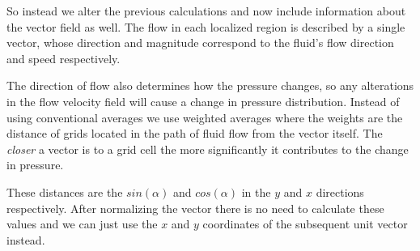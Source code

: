 \documentclass[12pt, titlepage]{article}
\begin{document}
\begin{center}
\end{center}

So instead we alter the previous calculations and now include information about the vector field as well. The flow in each localized region is described by a single vector, whose direction and magnitude correspond to the fluid's flow direction and speed respectively.

\bigskip

The direction of flow also determines how the pressure changes, so any alterations in the flow velocity field will cause a change in pressure distribution.
Instead of using conventional averages we use weighted averages where the weights are the distance of grids located in the path of fluid flow from the vector itself.
The \textit{closer} a vector is to a grid cell the more significantly it contributes to the change in pressure. 

\bigskip

These distances are the $sin(\alpha)$ and $cos(\alpha)$ in the $y$ and $x$ directions respectively. After normalizing the vector there is no need to calculate these values and we can just use the $x$ and $y$ coordinates of the subsequent unit vector instead.
\end{document}
